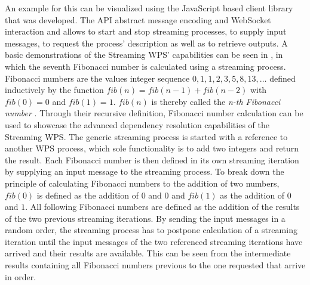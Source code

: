		An example for this can be visualized using the JavaScript based client library that was developed. The \ac{API} abstract message encoding and WebSocket interaction and allows to start and stop streaming processes, to supply input messages, to request the process' description as well as to retrieve outputs. A basic demonstrations of the Streaming WPS' capabilities can be seen in , in which the seventh Fibonacci number is calculated using a streaming process. Fibonacci numbers are the values integer sequence $0, 1, 1, 2, 3, 5, 8, 13, \dots$ defined inductively by the function $fib(n) = fib(n-1) + fib(n-2)$ with $fib(0) = 0$ and $fib(1) = 1$. $fib(n)$ is thereby called the \emph{n-th Fibonacci number} \citep{fibonacci}. Through their recursive definition, Fibonacci number calculation can be used to showcase the advanced dependency resolution capabilities of the Streaming WPS. The generic streaming process is started with a reference to another WPS process, which sole functionality is to add two integers and return the result. Each Fibonacci number is then defined in its own streaming iteration by supplying an input message to the streaming process. To break down the principle of calculating Fibonacci numbers to the addition of two numbers, $fib(0)$ is defined as the addition of $0$ and $0$ and $fib(1)$ as the addition of $0$ and $1$. All following Fibonacci numbers are defined as the addition of the results of the two previous streaming iterations. By sending the input messages in a random order, the streaming process has to postpone calculation of a streaming iteration until the input messages of the two referenced streaming iterations have arrived and their results are available. This can be seen from the intermediate results containing all Fibonacci numbers previous to the one requested that arrive in order.
